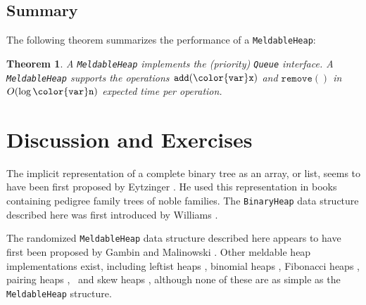 \documentclass[10pt]{book}
\theoremstyle{plain}
\newtheorem{thm}{Theorem}[chapter]
\newcommand{\thmlabel}[1]{\label{thm:#1}}
\theoremstyle{definition}
\begin{document}
\subsection{Summary}

The following theorem summarizes the performance of a \texttt{MeldableHeap}:

\begin{thm}\thmlabel{meldableheap}
  A \texttt{MeldableHeap} implements the (priority) \texttt{Queue} interface.
  A \texttt{MeldableHeap} supports the operations \ensuremath{\mathtt{add({\color{var}x})}} and \ensuremath{\mathtt{remove()}}
  in $O(\log \ensuremath{\mathtt{{\color{var}n}}})$ expected time per operation.
\end{thm}

\section{Discussion and Exercises}

The implicit representation of a complete binary tree as an array,
or list, seems to have been first proposed by Eytzinger \cite{e1590}.
He used this representation in books containing pedigree family trees
%
of noble families.  The \texttt{BinaryHeap} data structure described here was
first introduced by Williams \cite{w64}.

The randomized \texttt{MeldableHeap} data structure described here appears
to have first been proposed by Gambin and Malinowski \cite{gm98}.
Other meldable heap implementations exist, including 
leftist heaps \cite[Section~5.3.2]{c72,k97v3},
%
%
binomial heaps \cite{v78},
%
%
Fibonacci heaps \cite{ft87}, 
%
%
pairing heaps \cite{fsst86},\
%
%
 and skew heaps \cite{st83}, 
%
%
although none of these are as simple as the \texttt{MeldableHeap}
structure.
\end{document}

